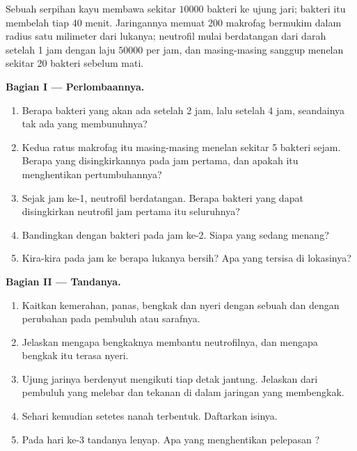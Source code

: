 \begin{problem}
\label{pb:g12:innate-immunity:1}
Sebuah serpihan kayu membawa sekitar $\num{10000}$ bakteri ke ujung
jari; bakteri itu membelah tiap 40 menit. Jaringannya memuat 200
makrofag bermukim dalam radius satu milimeter dari lukanya; neutrofil
mulai berdatangan dari darah setelah 1 jam dengan laju $\num{50000}$
per jam, dan masing-masing sanggup menelan sekitar 20 bakteri sebelum
mati.

\medskip
\noindent\textbf{Bagian I --- Perlombaannya.}
\begin{enumerate}
  \item Berapa bakteri yang akan ada setelah 2 jam, lalu setelah 4 jam,
        seandainya tak ada yang membunuhnya?
  \item Kedua ratus makrofag itu masing-masing menelan sekitar 5
        bakteri sejam. Berapa yang disingkirkannya pada jam pertama,
        dan apakah itu menghentikan pertumbuhannya?
  \item Sejak jam ke-1, neutrofil berdatangan. Berapa bakteri yang
        dapat disingkirkan neutrofil jam pertama itu seluruhnya?
  \item Bandingkan dengan  bakteri pada jam ke-2. Siapa yang
        sedang menang?
  \item Kira-kira pada jam ke berapa lukanya bersih? Apa yang tersisa
        di lokasinya?
\end{enumerate}

\medskip
\noindent\textbf{Bagian II --- Tandanya.}
\begin{enumerate}[resume]
  \item Kaitkan kemerahan, panas, bengkak dan nyeri dengan sebuah
         dan dengan perubahan pada pembuluh atau sarafnya.
  \item Jelaskan mengapa bengkaknya membantu neutrofilnya, dan mengapa
        bengkak itu terasa nyeri.
  \item Ujung jarinya berdenyut mengikuti tiap detak jantung. Jelaskan
        dari pembuluh yang melebar dan tekanan di dalam jaringan yang
        membengkak.
  \item Sehari kemudian setetes nanah terbentuk. Daftarkan isinya.
  \item Pada hari ke-3 tandanya lenyap. Apa yang menghentikan
        pelepasan ?
\end{enumerate}


\end{problem}
